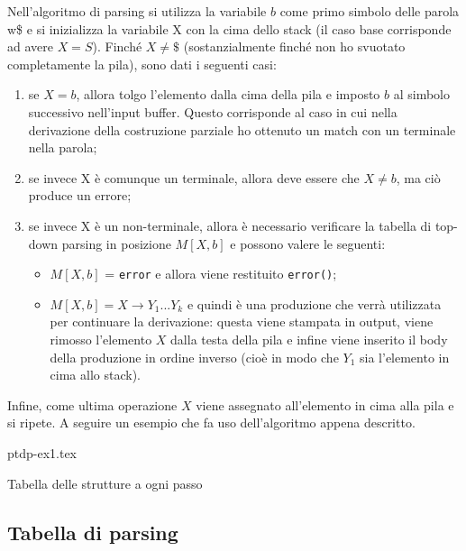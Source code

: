 \documentclass[class=book, crop=false, oneside, 12pt]{standalone}
\begin{document}
Nell'algoritmo di parsing si utilizza la variabile \(b\) come primo simbolo delle parola w\$ e si inizializza la variabile X con la cima dello stack (il caso base corrisponde ad avere \(X = S\)). Finché \(X \neq \$\) (sostanzialmente finché non ho svuotato completamente la pila), sono dati i seguenti casi:

\begin{enumerate}
    \item se \(X = b\), allora tolgo l'elemento dalla cima della pila e imposto \(b\) al simbolo successivo nell'input buffer. Questo corrisponde al caso in cui nella derivazione della costruzione parziale ho ottenuto un match con un terminale nella parola;
    \item se invece X è comunque un terminale, allora deve essere che \(X \neq b\), ma ciò produce un errore;
    \item se invece X è un non-terminale, allora è necessario verificare la tabella di top-down parsing in posizione \(M[X, b]\) e possono valere le seguenti:
    \begin{itemize}
        \item \(M[X, b]\) = \texttt{error} e allora viene restituito \texttt{error()};
        \item \(M[X, b] = X \rightarrow Y_1...Y_k\) e quindi è una produzione che verrà utilizzata per continuare la derivazione: questa viene stampata in output, viene rimosso l'elemento \(X\) dalla testa della pila e infine viene inserito il body della produzione in ordine inverso (cioè in modo che \(Y_1\) sia l'elemento in cima allo stack).
    \end{itemize}
\end{enumerate}

Infine, come ultima operazione \(X\) viene assegnato all'elemento in cima alla pila e si ripete. A seguire un esempio che fa uso dell'algoritmo appena descritto.
\begin{table}[H]
	\centering
	{ptdp-ex1.tex}
    \caption{Tabella delle strutture a ogni passo}
    \label{ptdp-ex1}
\end{table} 

\subsection{Tabella di parsing}
\end{document}
